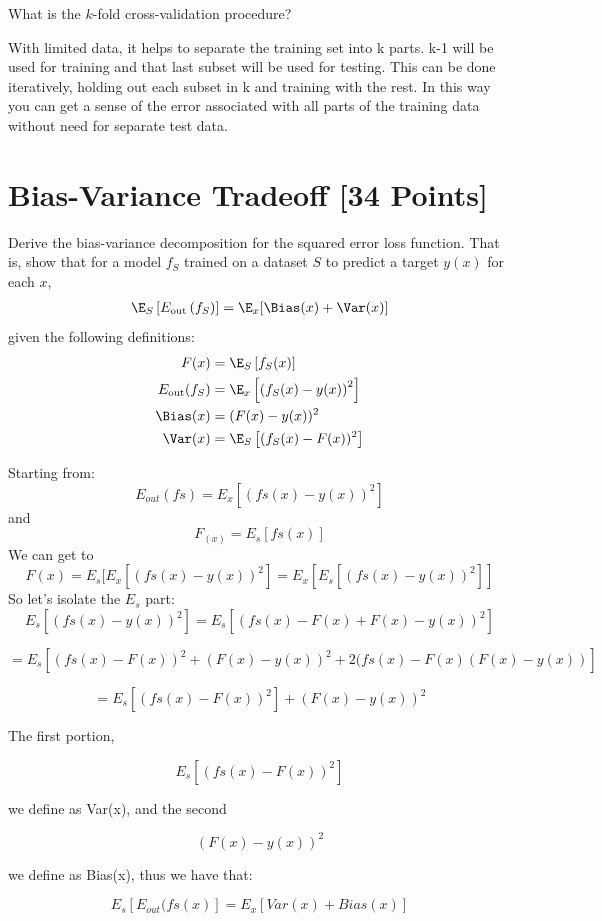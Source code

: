 \begin{problem}[2]
  What is the $k$-fold cross-validation procedure?
\end{problem}
\begin{solution}
    With limited data, it helps to separate the training set into k parts. k-1 will be used for training and that last subset will be used for testing. This can be done iteratively, holding out each subset in k and training with the rest. In this way you can get a sense of the error associated with all parts of the training data without need for separate test data.
\end{solution}




\newpage
\section{Bias-Variance Tradeoff [34 Points]}

\begin{problem}[5]
  Derive the bias-variance decomposition for the squared error loss function. That is, show that for a model $f_S$ trained on a dataset $S$ to predict a target $y(x)$ for each $x$,
  \begin{align*}
    \E_S \left[E_\text{out}\left(f_S\right)\right] = \E_x[\Bias(x) + \Var(x)]
  \end{align*}
  given the following definitions:
  \begin{align*}
    F(x) &= \E_S\left[f_S(x) \right] \\
    E_\text{out}(f_S) &= \E_x\left[\left(f_S(x) - y(x)\right)^2\right] \\
    \Bias(x) &= (F(x) - y(x))^2 \\
    \Var(x) &= \E_S\left[(f_S(x)-F(x))^2\right]
  \end{align*}
\end{problem}

\begin{solution}
  Starting from:  
  $$E_{out}(fs) = E_x[(fs(x)-y(x))^2]$$
and 
  $$F_(x) = E_s[fs(x)]$$
We can get to 
  $$F(x) = E_s[E_x[(fs(x)-y(x))^2] = E_x[E_s[(fs(x)-y(x))^2]]$$
So let's isolate the $E_s$ part:
  $$E_s[(fs(x)-y(x))^2] = E_s[(fs(x)-F(x) + F(x) - y(x))^2]$$
  
  $$= E_s[(fs(x)-F(x))^2 + (F(x) - y(x))^2 + 2(fs(x)-F(x)(F(x) - y(x))]$$

  $$= E_s[(fs(x)-F(x))^2] + (F(x) - y(x))^2$$

  The first portion, 
  
  $$E_s[(fs(x)-F(x))^2]$$

  we define as Var(x), and the second

  $$(F(x) - y(x))^2$$

  we define as Bias(x), thus we have that:

  $$E_s[E_{out}(fs(x)] = E_x[Var(x) + Bias(x)]$$
\end{solution}

